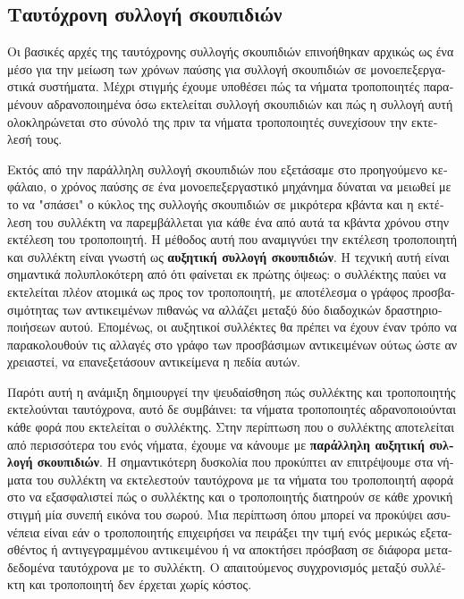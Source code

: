 \begin{greek}
\chapter{Ταυτόχρονη συλλογή σκουπιδιών}\label{ch:conc}     

Οι βασικές αρχές της ταυτόχρονης συλλογής σκουπιδιών επινοήθηκαν
αρχικώς ως ένα μέσο για την μείωση των χρόνων παύσης για συλλογή
σκουπιδιών σε μονοεπεξεργαστικά συστήματα. Μέχρι στιγμής  έχουμε
υποθέσει πώς τα νήματα τροποποιητές παραμένουν αδρανοποιημένα
όσω εκτελείται συλλογή σκουπιδιών και πώς η συλλογή αυτή
ολοκληρώνεται στο σύνολό της πριν τα νήματα τροποποιητές
συνεχίσουν την εκτελεσή τους.

Εκτός από την παράλληλη συλλογή σκουπιδιών που εξετάσαμε στο
προηγούμενο κεφάλαιο, ο χρόνος παύσης σε ένα μονοεπεξεργαστικό
μηχάνημα δύναται να μειωθεί με το να "σπάσει" ο κύκλος της 
συλλογής σκουπιδιών σε μικρότερα κβάντα και η εκτέλεση του
συλλέκτη να παρεμβάλλεται για κάθε ένα από αυτά τα κβάντα
χρόνου στην εκτέλεση του τροποποιητή. Η μέθοδος αυτή που
αναμιγνύει την εκτέλεση τροποποιητή και συλλέκτη είναι γνωστή
ως \textbf{αυξητική συλλογή σκουπιδιών}. Η τεχνική αυτή είναι
σημαντικά πολυπλοκότερη από ότι φαίνεται εκ πρώτης όψεως: ο
συλλέκτης παύει να εκτελείται πλέον ατομικά ως προς τον
τροποποιητή, με αποτέλεσμα ο γράφος προσβασιμότητας των
αντικειμένων πιθανώς να αλλάζει μεταξύ δύο διαδοχικών
δραστηριοποιήσεων αυτού. Επομένως, οι αυξητικοί συλλέκτες θα
πρέπει να έχουν έναν τρόπο να παρακολουθούν τις αλλαγές στο
γράφο των προσβάσιμων αντικειμένων ούτως ώστε αν χρειαστεί,
να επανεξετάσουν αντικείμενα η πεδία αυτών.

Παρότι αυτή η ανάμιξη δημιουργεί την ψευδαίσθηση πώς συλλέκτης
και τροποποιητής εκτελούνται ταυτόχρονα, αυτό δε συμβάινει:
τα νήματα τροποποιητές αδρανοποιούνται κάθε φορά που εκτελείται
ο συλλέκτης. Στην περίπτωση που ο συλλέκτης αποτελείται από
περισσότερα του ενός νήματα, έχουμε να κάνουμε με
\textbf{παράλληλη αυξητική συλλογή σκουπιδιών}. Η σημαντικότερη
δυσκολία που προκύπτει αν επιτρέψουμε στα νήματα του συλλέκτη
να εκτελεστούν ταυτόχρονα με τα νήματα του τροποποιητή αφορά
στο να εξασφαλιστεί πώς ο συλλέκτης και ο τροποποιητής
διατηρούν σε κάθε χρονική στιγμή μία συνεπή εικόνα του σωρού.
Μια περίπτωση όπου μπορεί να προκύψει ασυνέπεια είναι εάν ο
τροποποιητής επιχειρήσει να πειράξει την τιμή ενός μερικώς
εξετασθέντος ή αντιγεγραμμένου αντικειμένου ή να αποκτήσει
πρόσβαση σε διάφορα μεταδεδομένα ταυτόχρονα με το συλλέκτη.
Ο απαιτούμενος συγχρονισμός μεταξύ συλλέκτη και τροποποιητή
δεν έρχεται χωρίς κόστος.
 

\end{greek}
